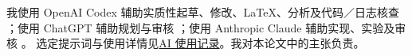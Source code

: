 \label{front:provenance}
我使用 OpenAI Codex 辅助实质性起草、修改、LaTeX、分析及代码／日志核查 \cite{ai_codex_record}；使用 ChatGPT 辅助规划与审核 \cite{ai_chatgpt_record}；使用 Anthropic Claude 辅助实现、实验及审核 \cite{ai_claude_record}。
选定提示词与使用详情见\href{https://github.com/lrlorry/8800_report/blob/main/docs/ai-use-record.md}{AI 使用记录}。我对本论文中的主张负责。
